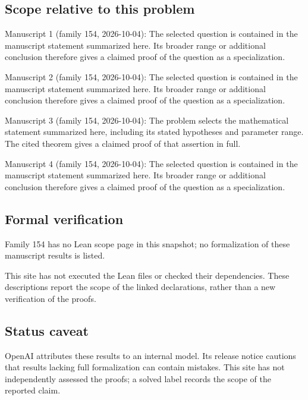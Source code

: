 \documentclass[11pt]{article}
\begin{document}
\subsection{Scope relative to this problem}
Manuscript 1 (family 154, 2026-10-04): The selected question is contained in the manuscript statement summarized here. Its broader range or additional conclusion therefore gives a claimed proof of the question as a specialization.

Manuscript 2 (family 154, 2026-10-04): The selected question is contained in the manuscript statement summarized here. Its broader range or additional conclusion therefore gives a claimed proof of the question as a specialization.

Manuscript 3 (family 154, 2026-10-04): The problem selects the mathematical statement summarized here, including its stated hypotheses and parameter range. The cited theorem gives a claimed proof of that assertion in full.

Manuscript 4 (family 154, 2026-10-04): The selected question is contained in the manuscript statement summarized here. Its broader range or additional conclusion therefore gives a claimed proof of the question as a specialization.

\subsection{Formal verification}
Family 154 has no Lean scope page in this snapshot; no formalization of these manuscript results is listed.

This site has not executed the Lean files or checked their dependencies. These descriptions report the scope of the linked declarations, rather than a new verification of the proofs.

\subsection{Status caveat}
OpenAI attributes these results to an internal model. Its release notice cautions that results lacking full formalization can contain mistakes. This site has not independently assessed the proofs; a solved label records the scope of the reported claim.
\end{document}
